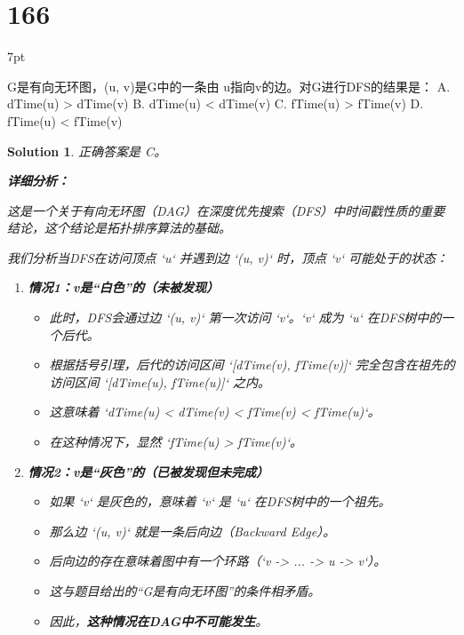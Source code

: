 \documentclass[UTF8]{report}
\newtheorem{solution}{Solution}
\theoremstyle{MyLineTheoremStyle} %
\theoremstyle{MyBlockTheoremStyle} %
\theoremstyle{MySubsubsectionStyle} %
\newenvironment{graybox}{%
        \def\FrameCommand{%
        \hspace{1pt}%
        {\color{gray}\small \vrule width 2pt}%
        {\color{graybox_color}\vrule width 4pt}%
        \colorbox{graybox_color}%
        }%
        \MakeFramed{\advance\hsize-\width\FrameRestore}%
        \noindent\hspace{-4.55pt}%
        \begin{adjustwidth}{}{7pt}%
        \vspace{2pt}\vspace{2pt}%
        }
        {%
        \vspace{2pt}\end{adjustwidth}\endMakeFramed%
        }
\begin{document}
\section*{166}
\begin{graybox}
G是有向无环图，(u, v)是G中的一条由
u指向v的边。对G进行DFS的结果是：
A. dTime(u) > dTime(v)
B. dTime(u) < dTime(v)
C. fTime(u) > fTime(v)
D. fTime(u) < fTime(v)
\end{graybox}

\begin{solution}
正确答案是 C。

\textbf{详细分析：}

这是一个关于有向无环图（DAG）在深度优先搜索（DFS）中时间戳性质的重要结论，这个结论是拓扑排序算法的基础。

我们分析当DFS在访问顶点 `u` 并遇到边 `(u, v)` 时，顶点 `v` 可能处于的状态：

\begin{enumerate}
    \item \textbf{情况1：v是“白色”的（未被发现）}
    \begin{itemize}
        \item 此时，DFS会通过边 `(u, v)` 第一次访问 `v`。`v` 成为 `u` 在DFS树中的一个后代。
        \item 根据括号引理，后代的访问区间 `[dTime(v), fTime(v)]` 完全包含在祖先的访问区间 `[dTime(u), fTime(u)]` 之内。
        \item 这意味着 `dTime(u) < dTime(v) < fTime(v) < fTime(u)`。
        \item 在这种情况下，显然 `fTime(u) > fTime(v)`。
    \end{itemize}

    \item \textbf{情况2：v是“灰色”的（已被发现但未完成）}
    \begin{itemize}
        \item 如果 `v` 是灰色的，意味着 `v` 是 `u` 在DFS树中的一个祖先。
        \item 那么边 `(u, v)` 就是一条后向边（Backward Edge）。
        \item 后向边的存在意味着图中有一个环路（`v -> ... -> u -> v`）。
        \item 这与题目给出的“G是有向无环图”的条件相矛盾。
        \item 因此，\textbf{这种情况在DAG中不可能发生}。
    \end{itemize}


\end{enumerate}
\end{solution}
\end{document}
